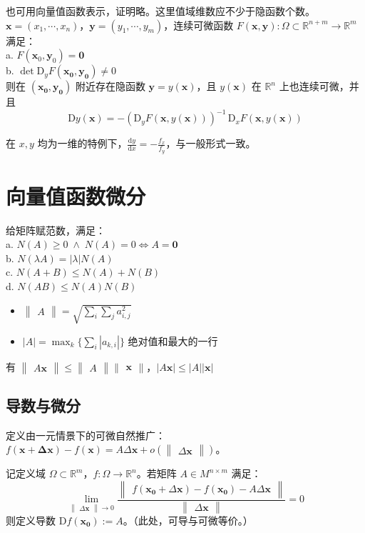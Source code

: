 \documentclass[12pt, a4paper, UTF8, openany]{ctexbook}
\newcommand{\dif}{\mathrm{d}}
\newcommand{\Dif}{\mathrm{D}}
\newcommand{\field}[1]{\mathbb{#1}}%
\newcommand{\mat}[1]{\mathbf{#1}}
\newcommand{\len}[1]{\begin{Vmatrix}#1\end{Vmatrix}}%
\begin{document}
        也可用向量值函数表示，证明略。这里值域维数应不少于隐函数个数。\\
        $\mat{x} = (x_1, \cdots, x_n)$，$\mat{y} = (y_1, \cdots, y_m)$，连续可微函数 $F(\mat{x}, \mat{y}): \Omega \subset \field{R}^{n + m} \to \field{R}^{m}$ 满足：\\
        a. $F(\mat{x}_0, \mat{y}_0) = \mat{0}$ \\
        b. $\det \Dif_{y} F(\mat{x_0}, \mat{y_0}) \neq 0$ \\
        则在 $(\mat{x_0}, \mat{y_0})$ 附近存在隐函数 $\mat{y} = y(\mat{x})$，且 $y(\mat{x})$ 在 $\field{R}^{n}$ 上也连续可微，并且
        $$\Dif y(\mat{x}) = -(\Dif_y F(\mat{x}, y(\mat{x})))^{-1} \, \Dif_x F(\mat{x}, y(\mat{x}))$$

        在 $x, y$ 均为一维的特例下，$\frac{\dif y}{\dif x} = -\frac{f_x}{f_y}$，与一般形式一致。

    \section{向量值函数微分}
    给矩阵赋范数，满足：\\
    a. $N(A) \geqslant 0 \; \land \; N(A) = 0 \iff A = \mat{0}$ \\
    b. $N(\lambda A) = |\lambda|N(A)$ \\
    c. $N(A + B) \leqslant N(A) + N(B)$ \\
    d. $N(AB) \leqslant N(A)N(B)$

    \begin{itemize}
        \item $\len{A} = \sqrt{\sum_i\sum_j a_{i, j}^2}$
        \item $|A| = \max_k\{ \sum_{i} |a_{k, i}| \}$ 绝对值和最大的一行
    \end{itemize}
    有 $\len{A\mat{x}} \leqslant \len{A}\len{\mat{x}}$，$|A\mat{x}| \leqslant |A||\mat{x}|$

        \subsection{导数与微分}
        定义由一元情景下的可微自然推广：$f(\mat{x + \Delta x}) - f(\mat{x}) = A\Delta\mat{x} + o(\len{\Delta\mat{x}})$。

        记定义域 $\Omega \subset \field{R}^m$，$f: \Omega \to \field{R}^n$。若{\heiti 矩阵} $A \in M^{n \times m}$ 满足：
        $$\lim_{\len{\Delta \mat{x}} \to 0} \frac{\len{f(\mat{x_0} + \Delta\mat{x}) - f(\mat{x_0}) - A\Delta\mat{x}}}{\len{\Delta \mat{x}}} = 0$$
        则定义导数 $\Dif f(\mat{x_0}) := A$。（此处，可导与可微等价。）
\end{document}
